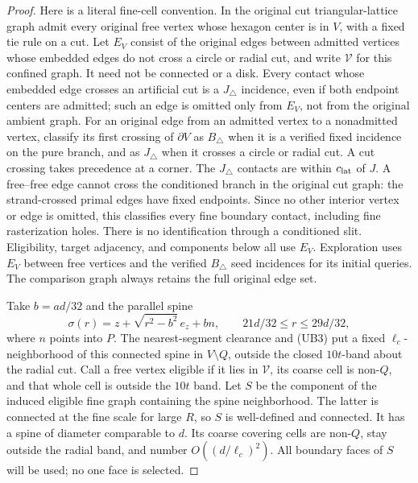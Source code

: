 \begin{proof}
Here is a literal fine-cell convention.  In the original cut
triangular-lattice graph admit every original free vertex whose
hexagon center is in \(V\), with a fixed tie rule on a cut.  Let
\(E_V\) consist of the original edges between admitted vertices
whose embedded edges do not cross a circle or radial cut, and write
\(\mathcal V\) for this confined graph.  It need not be connected
or a disk.  Every contact whose embedded edge crosses an artificial
cut is a \(J_\triangle\) incidence, even if both endpoint centers
are admitted; such an edge is omitted only from \(E_V\), not from
the original ambient graph.  For an original edge from an admitted
vertex to a nonadmitted vertex, classify its first crossing of
\(\partial V\) as \(B_\triangle\) when it is a verified fixed
incidence on the pure branch, and as \(J_\triangle\) when it crosses
a circle or radial cut.  A cut crossing takes precedence at a corner.
The \(J_\triangle\) contacts are within \(c_{\rm lat}\) of \(J\).
A free--free edge cannot cross the conditioned branch in the original
cut graph: the strand-crossed primal edges have fixed endpoints.
Since no other interior vertex or edge is omitted, this classifies
every fine boundary contact, including fine rasterization holes.
There is no identification through a conditioned slit.  Eligibility,
target adjacency, and components below all use \(E_V\).  Exploration
uses \(E_V\) between free vertices and the verified \(B_\triangle\)
seed incidences for its initial queries.  The comparison graph always
retains the full original edge set.

Take \(b=ad/32\) and the parallel spine
\[
 \sigma(r)=z+\sqrt{r^2-b^2}\,e_z+b n,\qquad
        21d/32\le r\le29d/32,
\]
where \(n\) points into \(P\).  The nearest-segment clearance and
(UB3) put a fixed \(\ell_c\)-neighborhood of this connected spine in
\(V\setminus Q\), outside the closed \(10t\)-band about the radial
cut.  Call a free vertex eligible if it lies in \(\mathcal V\), its
coarse cell is non-\(Q\), and that whole cell is outside the \(10t\)
band.  Let \(S\) be the component of the induced eligible fine graph
containing the spine neighborhood.  The latter is connected at the
fine scale for large \(R\), so \(S\) is well-defined and connected.
It has a spine of diameter comparable to \(d\).  Its coarse covering
cells are non-\(Q\), stay outside the radial band, and number
\(O((d/\ell_c)^2)\).  All boundary faces of \(S\) will be used; no one
face is selected.


\end{proof}
